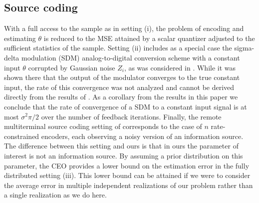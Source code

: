 \documentclass[letterpaper, conference]{IEEEtran}      %
\begin{document}

\subsection*{Source coding}
With a full access to the sample as in setting (i), the problem of encoding and estimating $\theta$ is reduced to the MSE attained by a scalar quantizer adjusted to the sufficient statistics of the sample. Setting (ii) includes as a special case the sigma-delta modulation (SDM) analog-to-digital conversion scheme with a constant input $\theta$ corrupted by Gaussian noise $Z_i$, as was considered in \cite{53738}. While it was shown there that the output of the modulator converges to the true constant input, the rate of this convergence was not analyzed and cannot be derived directly from the results of \cite{53738}. As a corollary from the results in this paper we conclude that the rate of convergence of a SDM to a constant input signal is at most $\sigma^2\pi/2$ over the number of feedback iterations. Finally, the remote multiterminal source coding setting of \cite{berger1996ceo} corresponds to the case of $n$ rate-constrained encoders, each observing a noisy version of an information source. The difference between this setting and ours is that in ours the parameter of interest is not an information source. By assuming a prior distribution on this parameter, the CEO provides a lower bound on the estimation error in the fully distributed setting (iii). This lower bound can be attained if we were to consider the average error in multiple independent realizations of our problem rather than a single realization as we do here. \\
\end{document}
